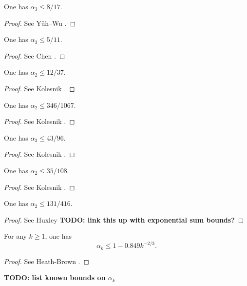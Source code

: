 \begin{lemma}
One has $\alpha_3 \le 8/17$.
\end{lemma}
\begin{proof}
See Y\"{u}h--Wu \cite{yuh_wu_divisor_1962}.
\end{proof}

\begin{lemma}
One has $\alpha_3 \le 5/11$.
\end{lemma}
\begin{proof}
See Chen \cite{chen_divisor_1965}.
\end{proof}

\begin{lemma}
One has $\alpha_2 \le 12/37$.
\end{lemma}
\begin{proof}
See Kolesnik \cite{kolesnik_improvement_1969}.
\end{proof}

\begin{lemma}
One has $\alpha_2 \le 346/1067$.
\end{lemma}
\begin{proof}
See Kolesnik \cite{kolesnik_1973}.
\end{proof}

\begin{lemma}
One has $\alpha_3 \le 43/96$.
\end{lemma}
\begin{proof}
See Kolesnik \cite{kolesnik}.
\end{proof}


\begin{lemma}
One has $\alpha_2 \le 35/108$.
\end{lemma}
\begin{proof}
See Kolesnik \cite{kolesnik_order_1982}.
\end{proof}


\begin{lemma}
One has $\alpha_2 \le 131/416$.
\end{lemma}
\begin{proof}
See Huxley \cite{huxley_exponential_2003}
{\bf TODO: link this up with exponential sum bounds?}
\end{proof}

\begin{lemma}
For any $k \ge 1$, one has
\[
\alpha_k \le 1 - 0.849k^{-2/3}.
\]
\end{lemma}
\begin{proof}
See Heath-Brown \cite{heathbrown_new_2017}.
\end{proof}
{\bf TODO: list known bounds on $\alpha_k$}
